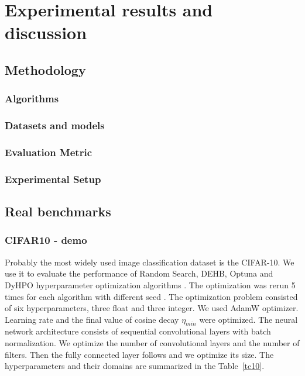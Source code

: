 \chapter{Experimental results and discussion}
\section{Methodology}

\subsection{Algorithms}

\subsection{Datasets and models}

\subsection{Evaluation Metric}

\subsection{Experimental Setup}


\section{Real benchmarks}
\subsection{CIFAR10 - demo}

Probably the most widely used image classification dataset is the CIFAR-10. We use it to evaluate the performance of Random Search, DEHB, Optuna and DyHPO hyperparameter optimization algorithms . The optimization was rerun 5 times for each algorithm with different seed . The optimization problem consisted of six hyperparameters, three float and three integer. We used AdamW optimizer. Learning rate and the final value of cosine decay $\eta_{min}$ were optimized. The neural network architecture consists of sequential convolutional layers with batch normalization. We optimize the number of convolutional layers and the number of filters. Then the fully connected layer follows and we optimize its size. The hyperparameters and their domains are summarized in the Table~\ref{tc10}.

